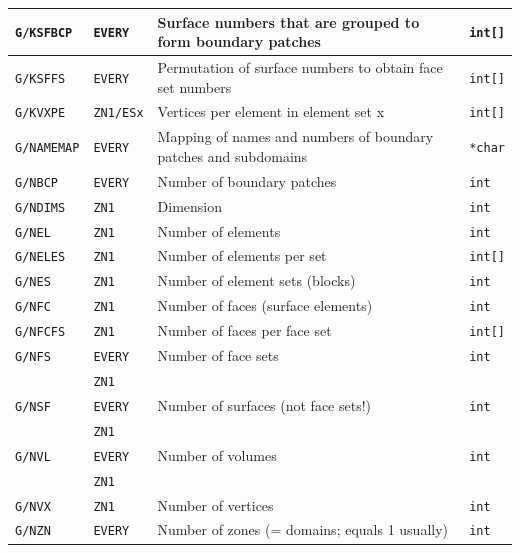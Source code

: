 \documentclass[a4paper,10pt]{article}
\begin{document}
\begin{table}
\begin{tabular}{llp{9cm}l}
    \texttt{G/KSFBCP}   & \texttt{EVERY}   & Surface numbers that are grouped to form boundary patches & \texttt{int[]} \\ \hline
    \texttt{G/KSFFS}    & \texttt{EVERY}   & Permutation of surface numbers to obtain face set numbers & \texttt{int[]} \\ \hline
    \texttt{G/KVXPE}    & \texttt{ZN1/ESx} & Vertices per element in element set x         & \texttt{int[]} \\ \hline
    \texttt{G/NAMEMAP}  & \texttt{EVERY}   & Mapping of names and numbers of boundary patches and subdomains & \texttt{*char} \\ \hline
    \texttt{G/NBCP}     & \texttt{EVERY}   & Number of boundary patches                    & \texttt{int} \\ \hline
    \texttt{G/NDIMS}    & \texttt{ZN1}     & Dimension                                     & \texttt{int} \\ \hline
    \texttt{G/NEL}      & \texttt{ZN1}     & Number of elements                            & \texttt{int} \\ \hline
    \texttt{G/NELES}    & \texttt{ZN1}     & Number of elements per set                    & \texttt{int[]} \\ \hline
    \texttt{G/NES}      & \texttt{ZN1}     & Number of element sets (blocks)               & \texttt{int} \\ \hline
    \texttt{G/NFC}      & \texttt{ZN1}     & Number of faces (surface elements)            & \texttt{int} \\ \hline
    \texttt{G/NFCFS}    & \texttt{ZN1}     & Number of faces per face set                  & \texttt{int[]} \\ \hline
    \texttt{G/NFS}      & \texttt{EVERY}   & Number of face sets                           & \texttt{int} \\
                         & \texttt{ZN1}     & & \\ \hline
    \texttt{G/NSF}      & \texttt{EVERY}   & Number of surfaces (not face sets!)           & \texttt{int} \\
                         & \texttt{ZN1}     &                                               & \\ \hline          
    \texttt{G/NVL}      & \texttt{EVERY}   & Number of volumes                             & \texttt{int}\\
                         & \texttt{ZN1}     &                                               & \\ \hline          
    \texttt{G/NVX}      & \texttt{ZN1}     & Number of vertices                            & \texttt{int} \\
    \texttt{G/NZN}      & \texttt{EVERY}   & Number of zones (= domains; equals 1 usually)  & \texttt{int}
  \end{tabular}
\end{table}
\end{document}
